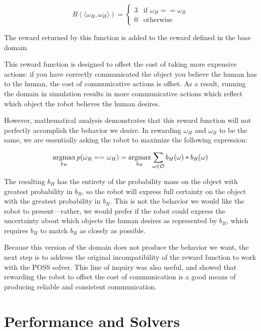 \documentclass{article}
\begin{document}
\begin{equation*}
	R(\langle \omega_R, \omega_H\rangle) = \begin{cases}
		3  & \text{if } \omega_H == \omega_R \\
		0  & \text{otherwise}
	\end{cases}
\end{equation*}

The reward returned by this function is added to the reward defined in the base domain. 

This reward function is designed to offset the cost of taking more expensive actions: if you have correctly communicated the object you believe the human has to the human, the cost of communicative actions is offset. As a result, running the domain in simulation results in more communicative actions which reflect which object the robot believes the human desires. 

However, mathematical analysis demonstrates that this reward function will not perfectly accomplish the behavior we desire. In rewarding $\omega_H$ and $\omega_R$ to be the same, we are essentially asking the robot to maximize the following expression: 


\newcommand{\argmax}{\operatornamewithlimits{argmax}}
\newcommand{\argmin}{\operatornamewithlimits{argmin}}

$$ \argmax_{b_H} p(\omega_R == \omega_H) = \argmax_{b_H} \sum_{\omega \in \mathcal{O}}  b_H(\omega) * b_R(\omega)$$

The resulting $b_H$ has the entirety of the probability mass on the object with greatest probability in $b_R$, so the robot will express full certainty on the object with the greatest probability in $b_R$. This is not the behavior we would like the robot to present---rather, we would prefer if the robot could express the uncertainty about which objects the human desires as represented by $b_R$, which requires $b_H$ to match $b_R$ as closely as possible.

Because this version of the domain does not produce the behavior we want, the next step is to address the original incompatibility of the reward function to work with the POSS solver. This line of inquiry was also useful, and showed that rewarding the robot to offset the cost of communication is a good means of producing reliable and consistent communication. 


\section{Performance and Solvers}
\end{document}
